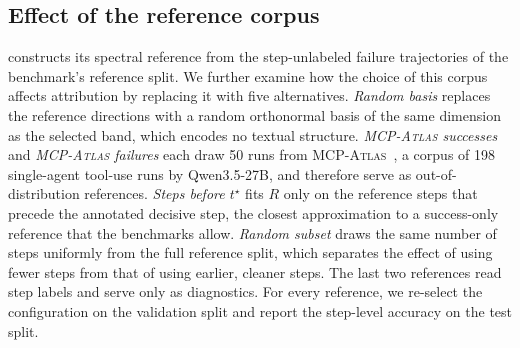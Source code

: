 \subsection{Effect of the reference corpus}
\label{app:reference-controls}

\soap{} constructs its spectral reference from the step-unlabeled failure trajectories of the benchmark's reference split. We further examine how the choice of this corpus affects attribution by replacing it with five alternatives. \emph{Random basis} replaces the reference directions with a random orthonormal basis of the same dimension as the selected band, which encodes no textual structure. \emph{\textsc{MCP-Atlas} successes} and \emph{\textsc{MCP-Atlas} failures} each draw 50 runs from \textsc{MCP-Atlas}~\citep{bandi2026mcpatlas}, a corpus of 198 single-agent tool-use runs by Qwen3.5-27B, and therefore serve as out-of-distribution references. \emph{Steps before $t^\star$} fits $R$ only on the reference steps that precede the annotated decisive step, the closest approximation to a success-only reference that the benchmarks allow. \emph{Random subset} draws the same number of steps uniformly from the full reference split, which separates the effect of using fewer steps from that of using earlier, cleaner steps. The last two references read step labels and serve only as diagnostics. For every reference, we re-select the configuration on the validation split and report the step-level accuracy on the test split.

